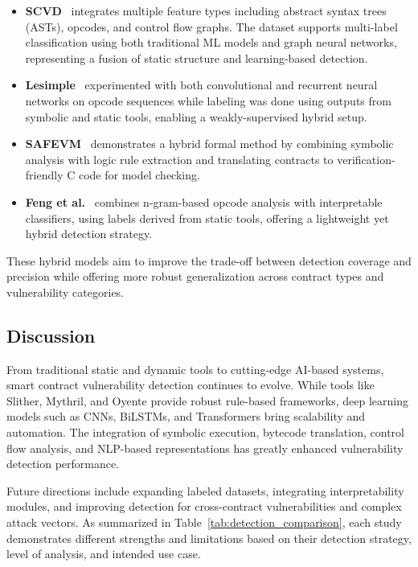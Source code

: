 \begin{itemize}
  \item \textbf{SCVD}~\cite{zhang2020scvd} integrates multiple feature types including abstract syntax trees (ASTs), opcodes, and control flow graphs. The dataset supports multi-label classification using both traditional ML models and graph neural networks, representing a fusion of static structure and learning-based detection.
  \item \textbf{Lesimple}~\cite{lesimple2020master} experimented with both convolutional and recurrent neural networks on opcode sequences while labeling was done using outputs from symbolic and static tools, enabling a weakly-supervised hybrid setup.
  \item \textbf{SAFEVM}~\cite{albert2019safevm} demonstrates a hybrid formal method by combining symbolic analysis with logic rule extraction and translating contracts to verification-friendly C code for model checking.
  \item \textbf{Feng et al.}~\cite{feng2024interpretable} combines n-gram-based opcode analysis with interpretable classifiers, using labels derived from static tools, offering a lightweight yet hybrid detection strategy.
\end{itemize}

These hybrid models aim to improve the trade-off between detection coverage and precision while offering more robust generalization across contract types and vulnerability categories.

\subsection*{Discussion}

From traditional static and dynamic tools to cutting-edge AI-based systems, smart contract vulnerability detection continues to evolve. While tools like Slither, Mythril, and Oyente provide robust rule-based frameworks, deep learning models such as CNNs, BiLSTMs, and Transformers bring scalability and automation. The integration of symbolic execution, bytecode translation, control flow analysis, and NLP-based representations has greatly enhanced vulnerability detection performance.

Future directions include expanding labeled datasets, integrating interpretability modules, and improving detection for cross-contract vulnerabilities and complex attack vectors. As summarized in Table~\ref{tab:detection_comparison}, each study demonstrates different strengths and limitations based on their detection strategy, level of analysis, and intended use case.


